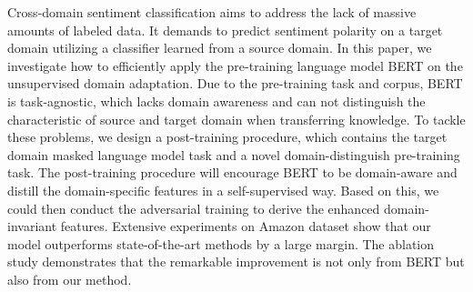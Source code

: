 Cross-domain sentiment classification aims to address the lack of massive amounts of labeled data. It demands to predict sentiment polarity on a target domain utilizing a classifier learned from a source domain. In this paper, we investigate how to efficiently apply the pre-training language model BERT on the unsupervised domain adaptation. Due to the pre-training task and corpus, BERT is task-agnostic, which lacks domain awareness and can not distinguish the characteristic of source and target domain when transferring knowledge. To tackle these problems, we design a post-training procedure, which contains the target domain masked language model task and a novel domain-distinguish pre-training task. The post-training procedure will encourage BERT to be domain-aware and distill the domain-specific features in a self-supervised way. Based on this, we could then conduct the adversarial training to derive the enhanced domain-invariant features. Extensive experiments on Amazon dataset show that our model outperforms state-of-the-art methods by a large margin. The ablation study demonstrates that the remarkable improvement is not only from BERT but also from our method.
